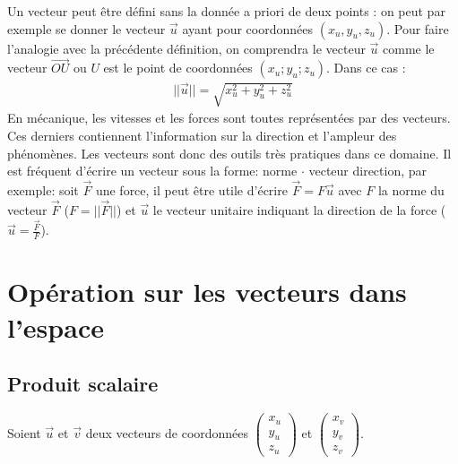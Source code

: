 \documentclass[letterpaper,10pt,english]{jupyterBook}
\begin{document}
\sphinxAtStartPar
Un vecteur peut être défini sans la donnée a priori de deux points : on peut par exemple se donner le vecteur \(\vec{u}\) ayant pour coordonnées \((x_u,y_u,z_u)\). Pour faire l’analogie avec la précédente définition, on comprendra le vecteur \(\vec{u}\) comme le vecteur \(\vec{O U}\) ou \(U\) est le point de coordonnées \((x_u;y_u;z_u)\). Dans ce cas :
\begin{equation*}
\begin{split}
||\vec{u}|| = \sqrt{x_u^2+y_u^2 + z_u^2}
\end{split}
\end{equation*}
\sphinxAtStartPar
{} En mécanique, les vitesses et les forces sont toutes représentées par des vecteurs. Ces derniers contiennent l’information sur la direction et l’ampleur des phénomènes. Les vecteurs sont donc des outils très pratiques dans ce domaine. Il est fréquent d’écrire un vecteur sous la forme: norme \(\cdot\) vecteur direction, par exemple: soit \(\vec{F}\) une force, il peut être utile d’écrire \(\vec{F} = F \vec{u}\) avec \(F\) la norme du vecteur \(\vec{F}\) (\(F=||\vec{F}||\)) et \(\vec{u}\) le vecteur unitaire indiquant la direction de la force (\(\vec{u} = \frac{\vec{F}}{F}\)).


\chapter{Opération sur les vecteurs dans l’espace}
\label{\detokenize{Part1/Cours:operation-sur-les-vecteurs-dans-l-espace}}

\section{Produit scalaire}
\label{\detokenize{Part1/Cours:produit-scalaire}}
\sphinxAtStartPar
Soient \(\vec{u}\) et \(\vec{v}\) deux vecteurs de coordonnées \(\begin{pmatrix} x_u \\ y_u \\ z_u \end{pmatrix}\) et \(\begin{pmatrix} x_v \\ y_v \\ z_v \end{pmatrix}\).
\end{document}
